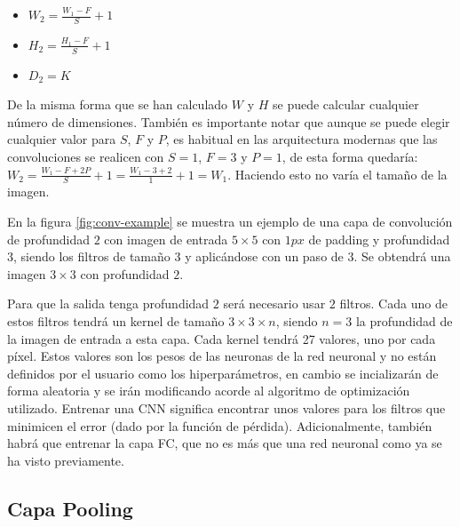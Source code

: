 \begin{itemize}
\item $W_2 = \frac{W_1 - F}{S} + 1$
\item $H_2 = \frac{H_1 - F}{S} + 1$
\item $D_2 = K$
\end{itemize}

De la misma forma que se han calculado $W$ y $H$ se puede calcular cualquier número de dimensiones. También es importante notar que aunque se puede elegir cualquier valor para $S$, $F$ y $P$, es habitual en las arquitectura modernas que las convoluciones se realicen con $S=1$, $F=3$ y $P=1$, de esta forma quedaría: $W_2 = \frac{W_1-F+2P}{S} + 1 = \frac{W_1 - 3 + 2}{1} + 1 = W_1$. Haciendo esto no varía el tamaño de la imagen.

En la figura \ref{fig:conv-example}\cite{Li2020} se muestra un ejemplo de una capa de convolución de profundidad $2$ con imagen de entrada $5 \times 5$ con $1 px$ de padding y profundidad $3$, siendo los filtros de tamaño $3$ y aplicándose con un paso de $3$. Se obtendrá una imagen $3\times 3$ con profundidad $2$.

Para que la salida tenga profundidad $2$ será necesario usar $2$ filtros. Cada uno de estos filtros tendrá un kernel de tamaño $3\times 3 \times n$, siendo $n=3$ la profundidad de la imagen de entrada a esta capa. Cada kernel tendrá 27 valores, uno por cada píxel. Estos valores son los pesos de las neuronas de la red neuronal y no están definidos por el usuario como los hiperparámetros, en cambio se incializarán de forma aleatoria y se irán modificando acorde al algoritmo de optimización utilizado. Entrenar una CNN significa encontrar unos valores para los filtros que minimicen el error (dado por la función de pérdida). Adicionalmente, también habrá que entrenar la capa FC, que no es más que una red neuronal como ya se ha visto previamente.


\newpage\subsection{Capa Pooling}\label{cnn_capa_pooling}

